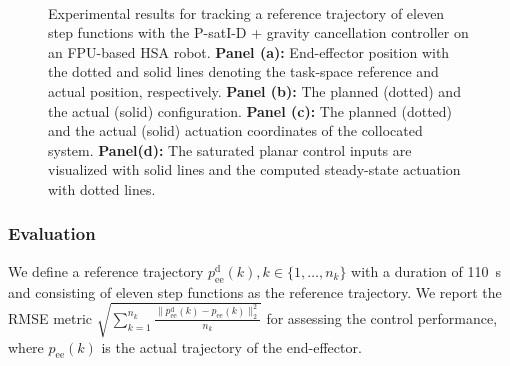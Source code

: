 \begin{figure}[ht]
    \\
    \caption{Experimental results for tracking a reference trajectory of eleven step functions with the P-satI-D + gravity cancellation controller on an FPU-based HSA robot. \textbf{Panel (a):} End-effector position with the dotted and solid lines denoting the task-space reference and actual position, respectively.
    \textbf{Panel (b):} The planned (dotted) and the actual (solid) configuration. 
    \textbf{Panel (c):} The planned (dotted) and the actual (solid) actuation coordinates of the collocated system. 
    \textbf{Panel(d):} The saturated planar control inputs are visualized with solid lines and the computed steady-state actuation with dotted lines.}\label{fig:hsacontrol:hsacontrol:experimental_results:fpu:p_sati_d_plus_gc}
\end{figure}

\subsubsection{Evaluation}
We define a reference trajectory $p_\mathrm{ee}^\mathrm{d}(k), k \in \{ 1, \dots, n_k \}$ with a duration of \SI{110}{s} and consisting of eleven step functions as the reference trajectory.
We report the \gls{RMSE} metric $\sqrt{\sum_{k=1}^{n_k} \frac{\lVert p_\mathrm{ee}^\mathrm{d}(k) - p_\mathrm{ee}(k) \rVert_2^2}{n_k}}$ for assessing the control performance, where $p_\mathrm{ee}(k)$ is the actual trajectory of the end-effector.\\

